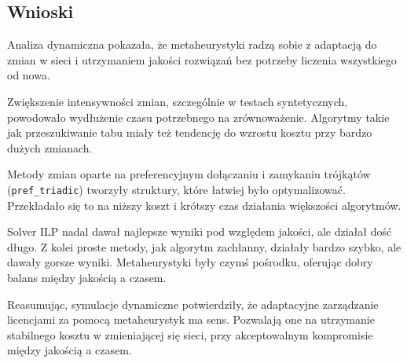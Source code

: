 \subsection{Wnioski}
Analiza dynamiczna pokazała, że metaheurystyki radzą sobie z adaptacją do zmian w sieci i utrzymaniem jakości rozwiązań bez potrzeby liczenia wszystkiego od nowa.

Zwiększenie intensywności zmian, szczególnie w testach syntetycznych, powodowało wydłużenie czasu potrzebnego na zrównoważenie. Algorytmy takie jak przeszukiwanie tabu miały też tendencję do wzrostu kosztu przy bardzo dużych zmianach.

Metody zmian oparte na preferencyjnym dołączaniu i zamykaniu trójkątów (\texttt{pref\_triadic}) tworzyły struktury, które łatwiej było optymalizować. Przekładało się to na niższy koszt i krótszy czas działania większości algorytmów.

Solver ILP nadal dawał najlepsze wyniki pod względem jakości, ale działał dość długo. Z kolei proste metody, jak algorytm zachłanny, działały bardzo szybko, ale dawały gorsze wyniki. Metaheurystyki były czymś pośrodku, oferując dobry balans między jakością a czasem.

Reasumując, symulacje dynamiczne potwierdziły, że adaptacyjne zarządzanie licencjami za pomocą metaheurystyk ma sens. Pozwalają one na utrzymanie stabilnego kosztu w zmieniającej się sieci, przy akceptowalnym kompromisie między jakością a czasem.
